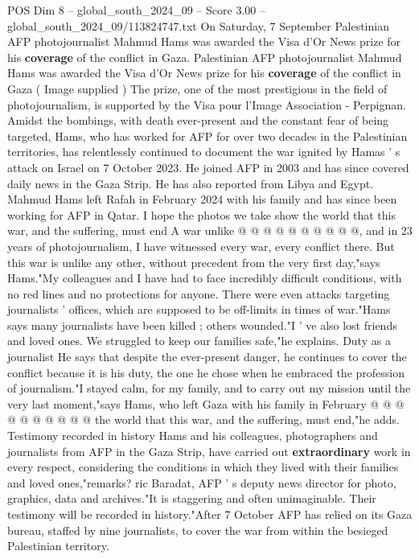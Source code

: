 \begin{textsample}{POS Dim 8 – global\_south\_2024\_09 – Score 3.00 – global\_south\_2024\_09/113824747.txt}  \label{ex:f8_pos_284}
On Saturday, 7 September Palestinian AFP photojournalist Mahmud Hams was awarded the Visa d'Or News prize for his \textbf{coverage} of the conflict in Gaza.
Palestinian AFP photojournalist Mahmud Hams was awarded the Visa d'Or News prize for his \textbf{coverage} of the conflict in Gaza ( Image supplied ) The prize, one of the most prestigious in the field of photojournalism, is supported by the Visa pour l'Image Association - Perpignan.
Amidst the bombings, with death ever-present and the constant fear of being targeted, Hams, who has worked for AFP for over two decades in the Palestinian territories, has relentlessly continued to document the war ignited by Hamas ' s attack on Israel on 7 October 2023.
He joined AFP in 2003 and has since covered daily news in the Gaza Strip.
He has also reported from Libya and Egypt.
Mahmud Hams left Rafah in February 2024 with his family and has since been working for AFP in Qatar.
I hope the photos we take show the world that this war, and the suffering, must end A war unlike @ @ @ @ @ @ @ @ @ @, and in 23 years of photojournalism, I have witnessed every war, every conflict there.
But this war is unlike any other, without precedent from the very first day,"says Hams."My colleagues and I have had to face incredibly difficult conditions, with no red lines and no protections for anyone.
There were even attacks targeting journalists ' offices, which are supposed to be off-limits in times of war."Hams says many journalists have been killed ; others wounded."I ' ve also lost friends and loved ones.
We struggled to keep our families safe,"he explains.
Duty as a journalist He says that despite the ever-present danger, he continues to cover the conflict because it is his duty, the one he chose when he embraced the profession of journalism."I stayed calm, for my family, and to carry out my mission until the very last moment,"says Hams, who left Gaza with his family in February @ @ @ @ @ @ @ @ @ @ the world that this war, and the suffering, must end,"he adds.
Testimony recorded in history Hams and his colleagues, photographers and journalists from AFP in the Gaza Strip, have carried out \textbf{extraordinary} work in every respect, considering the conditions in which they lived with their families and loved ones,"remarks? ric Baradat, AFP ' s deputy news director for photo, graphics, data and archives."It is staggering and often unimaginable.
Their testimony will be recorded in history."After 7 October AFP has relied on its Gaza bureau, staffed by nine journalists, to cover the war from within the besieged Palestinian territory.

\end{textsample}
